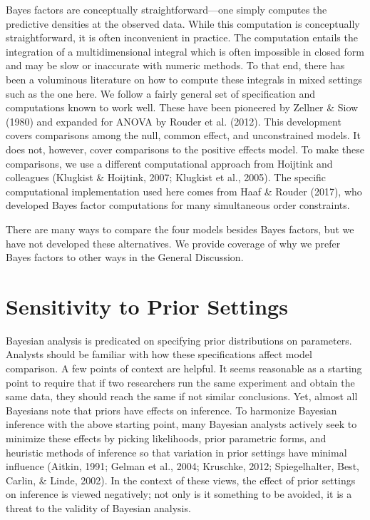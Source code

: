 \documentclass[english,man]{apa6}
\theoremstyle{definition}
\theoremstyle{definition}
\theoremstyle{remark}
\begin{document}
Bayes factors are conceptually straightforward---one simply computes the
predictive densities at the observed data. While this computation is
conceptually straightforward, it is often inconvenient in practice. The
computation entails the integration of a multidimensional integral which
is often impossible in closed form and may be slow or inaccurate with
numeric methods. To that end, there has been a voluminous literature on
how to compute these integrals in mixed settings such as the one here.
We follow a fairly general set of specification and computations known
to work well. These have been pioneered by Zellner \& Siow (1980) and
expanded for ANOVA by Rouder et al. (2012). This development covers
comparisons among the null, common effect, and unconstrained models. It
does not, however, cover comparisons to the positive effects model. To
make these comparisons, we use a different computational approach from
Hoijtink and colleagues (Klugkist \& Hoijtink, 2007; Klugkist et al.,
2005). The specific computational implementation used here comes from
Haaf \& Rouder (2017), who developed Bayes factor computations for many
simultaneous order constraints.

There are many ways to compare the four models besides Bayes factors,
but we have not developed these alternatives. We provide coverage of why
we prefer Bayes factors to other ways in the General Discussion.

\section{Sensitivity to Prior
Settings}\label{sensitivity-to-prior-settings}

Bayesian analysis is predicated on specifying prior distributions on
parameters. Analysts should be familiar with how these specifications
affect model comparison. A few points of context are helpful. It seems
reasonable as a starting point to require that if two researchers run
the same experiment and obtain the same data, they should reach the same
if not similar conclusions. Yet, almost all Bayesians note that priors
have effects on inference. To harmonize Bayesian inference with the
above starting point, many Bayesian analysts actively seek to minimize
these effects by picking likelihoods, prior parametric forms, and
heuristic methods of inference so that variation in prior settings have
minimal influence (Aitkin, 1991; Gelman et al., 2004; Kruschke, 2012;
Spiegelhalter, Best, Carlin, \& Linde, 2002). In the context of these
views, the effect of prior settings on inference is viewed negatively;
not only is it something to be avoided, it is a threat to the validity
of Bayesian analysis.
\end{document}
